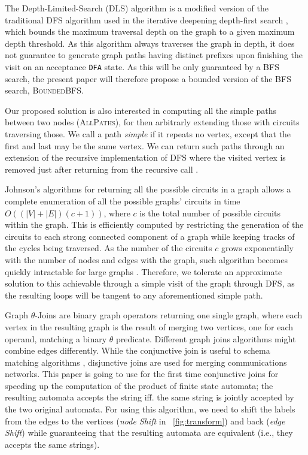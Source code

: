 \documentclass[sigconf]{acmart}
\begin{document}
The Depth-Limited-Search (DLS) algorithm is a modified version of the traditional DFS algorithm used in the iterative deepening depth-first search \cite{DBLP:journals/ai/Korf85}, which  bounds the maximum traversal depth on the graph to a given maximum depth threshold. As this algorithm always traverses the graph in depth, it does not guarantee to generate graph paths having distinct prefixes upon finishing the visit on an acceptance \texttt{DFA} state. As this will be only guaranteed by a BFS search, the present paper will therefore propose a bounded version of the BFS search, \textsc{BoundedBFS}.

Our proposed solution is also interested in computing all the simple paths between two nodes (\textsc{AllPaths}), for then arbitrarly extending those with circuits traversing those. We call a path \textit{simple} if it repeats no vertex, except that the first and last may be the same vertex. We can return such paths through an extension of the recursive implementation of DFS where the visited vertex is removed just after returning from the recursive call \cite{ASPNIST}. 


Johnson's algorithms for returning all the possible circuits in a graph \cite{doi:10.1137/0204007} allows a complete enumeration of all the possible graphs' circuits in time $O((|V|+|E|)(c+1))$, where $c$ is the total number of possible circuits within the graph. This is efficiently computed by restricting the generation of the circuits to each strong connected component of a graph while keeping tracks of the cycles being traversed. As the number of the circuits $c$ grows exponentially with the number of nodes and edges with the graph, such algorithm becomes quickly intractable for large graphs \cite{DBLP:conf/fcs/HawickJ08}. Therefore, we tolerate an approximate solution to this achievable through a simple visit of the graph through DFS, as the resulting loops will be tangent to any aforementioned simple path. 

Graph $\theta$-Joins \cite{DBLP:conf/ideas/Bergami21} are binary graph  operators returning one single graph, where each vertex in the resulting graph is the result of merging two vertices, one for each operand, matching a binary $\theta$ predicate. Different graph joins algorithms might combine edges differently. While the conjunctive join is useful to schema matching algorithms \cite{DBLP:books/sp/Melnik04}, disjunctive joins are used for merging communications networks. This paper is going to use for the first time conjunctive joins for speeding up the computation of the product of finite state automata; the resulting automata accepts the string iff. the same string is jointly accepted by the two original automata. For using this algorithm, we need to shift the labels from the edges to the vertices (\textit{node Shift} in \figurename~\ref{fig:transform}) and back (\textit{edge Shift}) while guaranteeing that the resulting automata are equivalent (i.e., they accepts the same strings).
\end{document}

